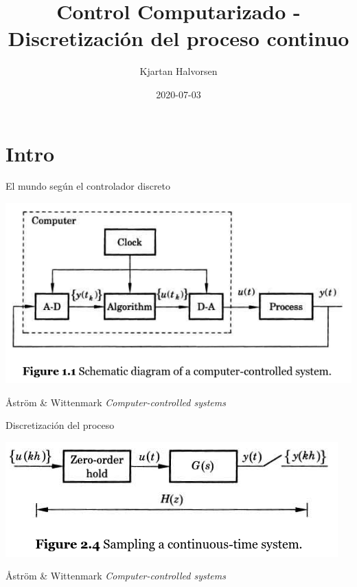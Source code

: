 \documentclass[presentation,aspectratio=169]{beamer}
\author{Kjartan Halvorsen}
\date{2020-07-03}
\title{Control Computarizado - Discretización del proceso continuo}
\begin{document}
\maketitle

\section{Intro}
\label{sec:org2028aa8}
\begin{frame}[label={sec:org1ddd1ef}]{El mundo según el controlador discreto}
\begin{center}
\includegraphics[width=0.7\linewidth]{../../figures/fig1-1-schematic.png}
\end{center}
{\footnotesize Åström \& Wittenmark \textit{Computer-controlled systems}}
\end{frame}
\begin{frame}[label={sec:org502b359}]{Discretización del proceso}
\begin{center}
\includegraphics[width=0.6\linewidth]{../../figures/fig2-4.png}
\end{center}
{\footnotesize Åström \& Wittenmark \textit{Computer-controlled systems}}
\end{frame}
\end{document}
